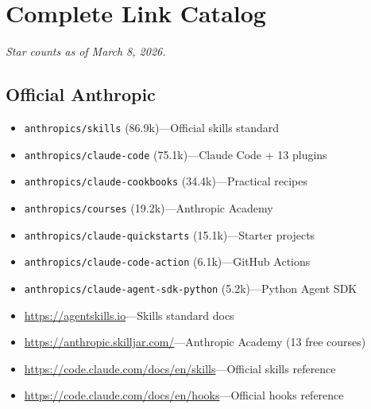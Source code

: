 \documentclass[11pt,a4paper]{article}
\begin{document}
\newpage

\section{Complete Link Catalog}

\textit{Star counts as of March 8, 2026.}

\subsection{Official Anthropic}
\begin{itemize}[leftmargin=1em]
  \item \texttt{anthropics/skills} (86.9k)---Official skills standard
  \item \texttt{anthropics/claude-code} (75.1k)---Claude Code + 13 plugins
  \item \texttt{anthropics/claude-cookbooks} (34.4k)---Practical recipes
  \item \texttt{anthropics/courses} (19.2k)---Anthropic Academy
  \item \texttt{anthropics/claude-quickstarts} (15.1k)---Starter projects
  \item \texttt{anthropics/claude-code-action} (6.1k)---GitHub Actions
  \item \texttt{anthropics/claude-agent-sdk-python} (5.2k)---Python Agent SDK
  \item \url{https://agentskills.io}---Skills standard docs
  \item \url{https://anthropic.skilljar.com/}---Anthropic Academy (13 free courses)
  \item \url{https://code.claude.com/docs/en/skills}---Official skills reference
  \item \url{https://code.claude.com/docs/en/hooks}---Official hooks reference
\end{itemize}
\end{document}
